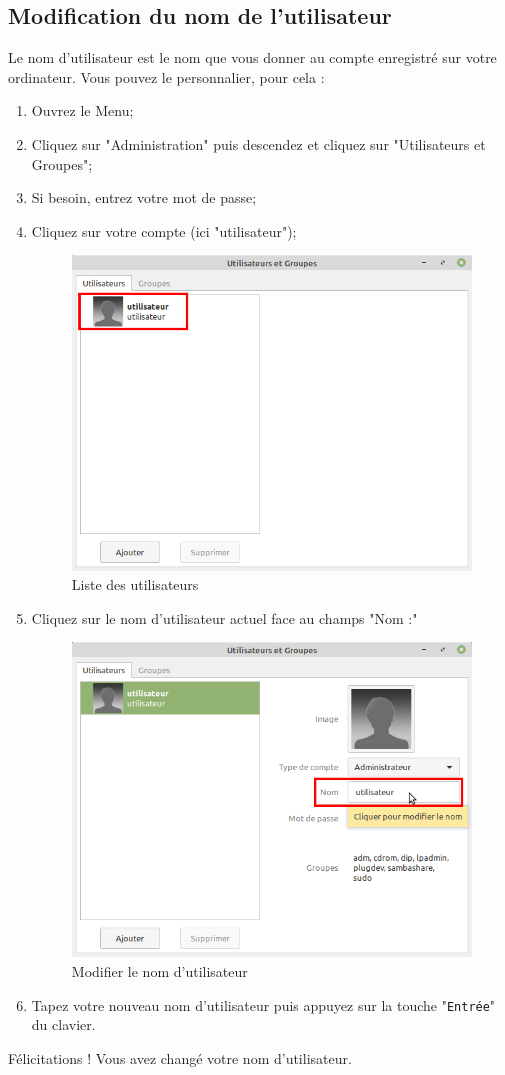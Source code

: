 \documentclass[12pt]{book}
\begin{document}
	\subsection{Modification du nom de l'utilisateur}
		Le nom d'utilisateur est le nom que vous donner au compte enregistré sur votre ordinateur.
		Vous pouvez le personnalier, pour cela :
		\begin{enumerate}
			\item Ouvrez le Menu;
			\item Cliquez sur "Administration" puis descendez et cliquez sur "Utilisateurs et Groupes";
			\item Si besoin, entrez votre mot de passe;
			\item Cliquez sur votre compte (ici "utilisateur");
			\begin{figure}[h]
				\centering
				\includegraphics[width=.5\textwidth]{include/users.png}
				\caption{Liste des utilisateurs}
				\label{fig:listuser}
			\end{figure}
			\item Cliquez sur le nom d'utilisateur actuel face au champs "Nom :"
			\begin{figure}[h]
				\centering
				\includegraphics[width=.53\textwidth]{include/nomuser.png}
				\caption{Modifier le nom d'utilisateur}
				\label{fig:nomuser}
			\end{figure}
			\item Tapez votre nouveau nom d'utilisateur puis appuyez sur la touche "\texttt{Entrée}" du clavier.
		\end{enumerate}
		Félicitations ! Vous avez changé votre nom d'utilisateur.
\end{document}
